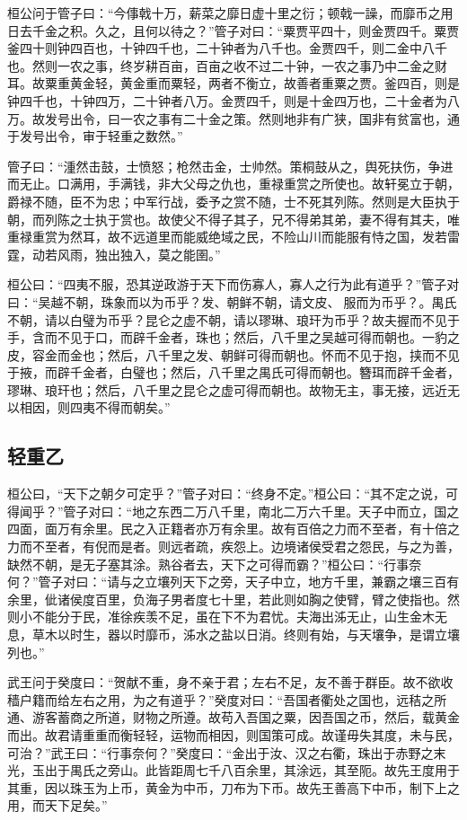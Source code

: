 \documentclass[]{article}
\begin{document}
桓公问于管子曰：``今倳戟十万，薪菜之靡日虚十里之衍；顿戟一譟，而靡币之用日去千金之积。久之，且何以待之？''管子对曰：``粟贾平四十，则金贾四千。粟贾釜四十则钟四百也，十钟四千也，二十钟者为八千也。金贾四千，则二金中八千也。然则一农之事，终岁耕百亩，百亩之收不过二十钟，一农之事乃中二金之财耳。故粟重黄金轻，黄金重而粟轻，两者不衡立，故善者重粟之贾。釜四百，则是钟四千也，十钟四万，二十钟者八万。金贾四千，则是十金四万也，二十金者为八万。故发号出令，曰一农之事有二十金之策。然则地非有广狭，国非有贫富也，通于发号出令，审于轻重之数然。''

管子曰：``湩然击鼓，士愤怒；枪然击金，士帅然。策桐鼓从之，舆死扶伤，争进而无止。口满用，手满钱，非大父母之仇也，重禄重赏之所使也。故轩冕立于朝，爵禄不随，臣不为忠；中军行战，委予之赏不随，士不死其列陈。然则是大臣执于朝，而列陈之士执于赏也。故使父不得子其子，兄不得弟其弟，妻不得有其夫，唯重禄重赏为然耳，故不远道里而能威绝域之民，不险山川而能服有恃之国，发若雷霆，动若风雨，独出独入，莫之能圉。''

桓公曰：``四夷不服，恐其逆政游于天下而伤寡人，寡人之行为此有道乎？''管子对曰：``吴越不朝，珠象而以为币乎？发、朝鲜不朝，请文皮、服而为币乎？。禺氏不朝，请以白璧为币乎？昆仑之虚不朝，请以璆琳、琅玕为币乎？故夫握而不见于手，含而不见于口，而辟千金者，珠也；然后，八千里之吴越可得而朝也。一豹之皮，容金而金也；然后，八千里之发、朝鲜可得而朝也。怀而不见于抱，挟而不见于掖，而辟千金者，白璧也；然后，八千里之禺氏可得而朝也。簪珥而辟千金者，璆琳、琅玕也；然后，八千里之昆仑之虚可得而朝也。故物无主，事无接，远近无以相因，则四夷不得而朝矣。''

\hypertarget{header-n1075}{%
\subsection{轻重乙}\label{header-n1075}}

桓公曰，``天下之朝夕可定乎？''管子对曰：``终身不定。''桓公曰：``其不定之说，可得闻乎？''管子对曰：``地之东西二万八千里，南北二万六千里。天子中而立，国之四面，面万有余里。民之入正籍者亦万有余里。故有百倍之力而不至者，有十倍之力而不至者，有倪而是者。则远者疏，疾怨上。边境诸侯受君之怨民，与之为善，缺然不朝，是无子塞其涂。熟谷者去，天下之可得而霸？''桓公曰：``行事奈何？''管子对曰：``请与之立壤列天下之旁，天子中立，地方千里，兼霸之壤三百有余里，佌诸侯度百里，负海子男者度七十里，若此则如胸之使臂，臂之使指也。然则小不能分于民，准徐疾羡不足，虽在下不为君忧。夫海出泲无止，山生金木无息，草木以时生，器以时靡币，泲水之盐以日消。终则有始，与天壤争，是谓立壤列也。''

武王问于癸度曰：``贺献不重，身不亲于君；左右不足，友不善于群臣。故不欲收穑户籍而给左右之用，为之有道乎？''癸度对曰：``吾国者衢处之国也，远秸之所通、游客蓄商之所道，财物之所遵。故苟入吾国之粟，因吾国之币，然后，载黄金而出。故君请重重而衡轻轻，运物而相因，则国策可成。故谨毋失其度，未与民，可治？''武王曰：``行事奈何？''癸度曰：``金出于汝、汉之右衢，珠出于赤野之末光，玉出于禺氏之旁山。此皆距周七千八百余里，其涂远，其至阨。故先王度用于其重，因以珠玉为上币，黄金为中币，刀布为下币。故先王善高下中币，制下上之用，而天下足矣。''
\end{document}
